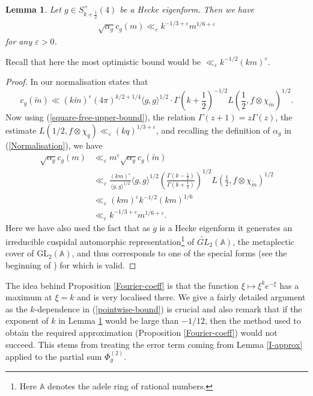\documentclass[a4paper,10pt,twoside]{amsart}
\newtheorem{lemma}[theorem]{Lemma}
\theoremstyle{definition}
\numberwithin{equation}{section}
\newcommand\eps{\varepsilon}
\renewcommand\:{\colon}
\begin{document}
\begin{lemma}\label{pointwise}
Let $g\in S_{k+\frac12}^+(4)$ be a Hecke eigenform. Then we have
\begin{align}\label{pointwise-bound}
\sqrt{\alpha_g}c_g(m)\ll_\varepsilon k^{-1/3+\varepsilon}m^{1/6+\varepsilon}
\end{align}
for any $\varepsilon>0$. 
\end{lemma}

\noindent Recall that here the most optimistic bound would be $\ll_\eps k^{-1/2}(km)^\eps$. 

\begin{proof} In our normalisation \cite[(9.1)]{Blomer-Harcos2008} states that 
\[ 
c_g(\tilde m)\ll (k\tilde m)^\varepsilon(4\pi)^{k/2+1/4}\langle g,g\rangle^{1/2}\cdot\Gamma\left(k+\frac12\right)^{-1/2}L\left(\frac 12,f\otimes\chi_{\tilde m}\right)^{1/2}.
\]
Now using (\ref{square-free-upper-bound}), the relation $\Gamma(z+1)=z\Gamma(z)$, the estimate $L(1/2,f\otimes\chi_q)\ll_\eps (kq)^{1/3+\eps}$, and recalling the definition of $\alpha_g$ in (\ref{Normalisation}), we have
\begin{align*}
\sqrt{\alpha_g}c_g(m)&\ll_\varepsilon m^\varepsilon\sqrt{\alpha_g}c_g(\tilde m)\\
&\ll_\varepsilon\frac{(km)^\varepsilon}{\langle g,g\rangle^{1/2}}\langle g,g\rangle^{1/2}\left(\frac{\Gamma\left(k-\frac12\right)}{\Gamma\left(k+\frac12\right)}\right)^{1/2}L\left(\frac 12,f\otimes\chi_{\tilde m}\right)^{1/2}\\
&\ll_\varepsilon (km)^\varepsilon k^{-1/2}(km)^{1/6}\\
&\ll_\varepsilon k^{-1/3+\varepsilon}m^{1/6+\varepsilon}. 
\end{align*}
Here we have also used the fact that as $g$ is a Hecke eigenform it generates an irreducible cuspidal automorphic representation\footnote{Here $\mathbb A$ denotes the adele ring of rational numbers.} of $\widetilde{GL}_2(\mathbb A)$, the metaplectic cover of $\mathrm{GL}_2(\mathbb A)$, and thus corresponds to one of the special forms (see the beginning of \cite[Section 7.1]{Mao2007}) for which \cite[(9.1)]{Blomer-Harcos2008} is valid.
\end{proof}
\noindent The idea behind Proposition \ref{Fourier-coeff} is that the function $\xi\mapsto \xi^{k}e^{-\xi}$ has a maximum at $\xi=k$ and is very localised there. We give a fairly detailed argument as the $k$-dependence in (\ref{pointwise-bound}) is crucial and also remark that if the exponent of $k$ in Lemma \ref{pointwise} would be large than $-1/12$, then the method used to obtain the required approximation (Proposition \ref{Fourier-coeff}) would not succeed. This stems from treating the error term coming from Lemma \ref{I-approx} applied to the partial sum $\Phi_g^{(2)}$. 
\end{document}
